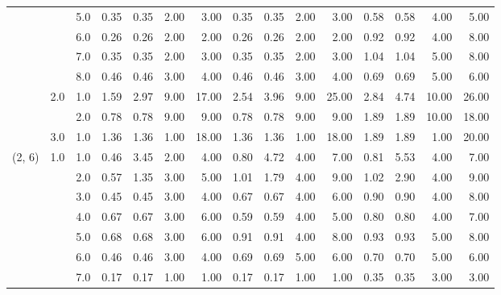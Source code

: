 \begin{tabular}{lllrrrrrrrrrrrr}
       &     & 5.0  &       0.35 &      0.35 & 2.00 &   3.00 &       0.35 &      0.35 &  2.00 &   3.00 &       0.58 &      0.58 &  4.00 &   5.00 \\
       &     & 6.0  &       0.26 &      0.26 & 2.00 &   2.00 &       0.26 &      0.26 &  2.00 &   2.00 &       0.92 &      0.92 &  4.00 &   8.00 \\
       &     & 7.0  &       0.35 &      0.35 & 2.00 &   3.00 &       0.35 &      0.35 &  2.00 &   3.00 &       1.04 &      1.04 &  5.00 &   8.00 \\
       &     & 8.0  &       0.46 &      0.46 & 3.00 &   4.00 &       0.46 &      0.46 &  3.00 &   4.00 &       0.69 &      0.69 &  5.00 &   6.00 \\
       & 2.0 & 1.0  &       1.59 &      2.97 & 9.00 &  17.00 &       2.54 &      3.96 &  9.00 &  25.00 &       2.84 &      4.74 & 10.00 &  26.00 \\
       &     & 2.0  &       0.78 &      0.78 & 9.00 &   9.00 &       0.78 &      0.78 &  9.00 &   9.00 &       1.89 &      1.89 & 10.00 &  18.00 \\
       & 3.0 & 1.0  &       1.36 &      1.36 & 1.00 &  18.00 &       1.36 &      1.36 &  1.00 &  18.00 &       1.89 &      1.89 &  1.00 &  20.00 \\
(2, 6) & 1.0 & 1.0  &       0.46 &      3.45 & 2.00 &   4.00 &       0.80 &      4.72 &  4.00 &   7.00 &       0.81 &      5.53 &  4.00 &   7.00 \\
       &     & 2.0  &       0.57 &      1.35 & 3.00 &   5.00 &       1.01 &      1.79 &  4.00 &   9.00 &       1.02 &      2.90 &  4.00 &   9.00 \\
       &     & 3.0  &       0.45 &      0.45 & 3.00 &   4.00 &       0.67 &      0.67 &  4.00 &   6.00 &       0.90 &      0.90 &  4.00 &   8.00 \\
       &     & 4.0  &       0.67 &      0.67 & 3.00 &   6.00 &       0.59 &      0.59 &  4.00 &   5.00 &       0.80 &      0.80 &  4.00 &   7.00 \\
       &     & 5.0  &       0.68 &      0.68 & 3.00 &   6.00 &       0.91 &      0.91 &  4.00 &   8.00 &       0.93 &      0.93 &  5.00 &   8.00 \\
       &     & 6.0  &       0.46 &      0.46 & 3.00 &   4.00 &       0.69 &      0.69 &  5.00 &   6.00 &       0.70 &      0.70 &  5.00 &   6.00 \\
       &     & 7.0  &       0.17 &      0.17 & 1.00 &   1.00 &       0.17 &      0.17 &  1.00 &   1.00 &       0.35 &      0.35 &  3.00 &   3.00 \\

\end{tabular}

